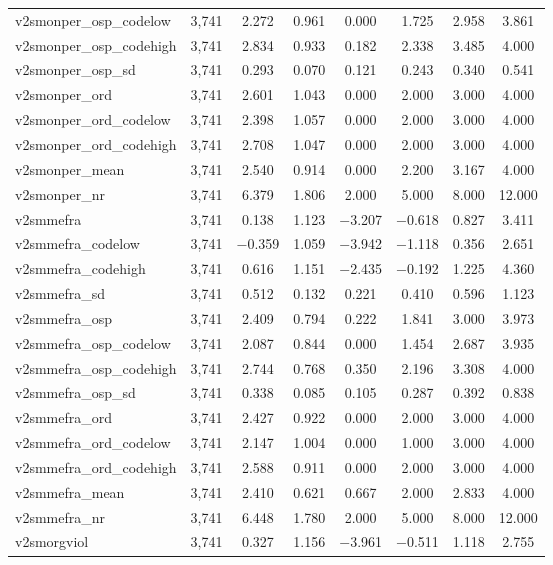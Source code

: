 \begin{table}[!htbp]
\begin{tabular}{@{\extracolsep{5pt}}lccccccc}
v2smonper\_osp\_codelow & 3,741 & 2.272 & 0.961 & 0.000 & 1.725 & 2.958 & 3.861 \\ 
v2smonper\_osp\_codehigh & 3,741 & 2.834 & 0.933 & 0.182 & 2.338 & 3.485 & 4.000 \\ 
v2smonper\_osp\_sd & 3,741 & 0.293 & 0.070 & 0.121 & 0.243 & 0.340 & 0.541 \\ 
v2smonper\_ord & 3,741 & 2.601 & 1.043 & 0.000 & 2.000 & 3.000 & 4.000 \\ 
v2smonper\_ord\_codelow & 3,741 & 2.398 & 1.057 & 0.000 & 2.000 & 3.000 & 4.000 \\ 
v2smonper\_ord\_codehigh & 3,741 & 2.708 & 1.047 & 0.000 & 2.000 & 3.000 & 4.000 \\ 
v2smonper\_mean & 3,741 & 2.540 & 0.914 & 0.000 & 2.200 & 3.167 & 4.000 \\ 
v2smonper\_nr & 3,741 & 6.379 & 1.806 & 2.000 & 5.000 & 8.000 & 12.000 \\ 
v2smmefra & 3,741 & 0.138 & 1.123 & $-$3.207 & $-$0.618 & 0.827 & 3.411 \\ 
v2smmefra\_codelow & 3,741 & $-$0.359 & 1.059 & $-$3.942 & $-$1.118 & 0.356 & 2.651 \\ 
v2smmefra\_codehigh & 3,741 & 0.616 & 1.151 & $-$2.435 & $-$0.192 & 1.225 & 4.360 \\ 
v2smmefra\_sd & 3,741 & 0.512 & 0.132 & 0.221 & 0.410 & 0.596 & 1.123 \\ 
v2smmefra\_osp & 3,741 & 2.409 & 0.794 & 0.222 & 1.841 & 3.000 & 3.973 \\ 
v2smmefra\_osp\_codelow & 3,741 & 2.087 & 0.844 & 0.000 & 1.454 & 2.687 & 3.935 \\ 
v2smmefra\_osp\_codehigh & 3,741 & 2.744 & 0.768 & 0.350 & 2.196 & 3.308 & 4.000 \\ 
v2smmefra\_osp\_sd & 3,741 & 0.338 & 0.085 & 0.105 & 0.287 & 0.392 & 0.838 \\ 
v2smmefra\_ord & 3,741 & 2.427 & 0.922 & 0.000 & 2.000 & 3.000 & 4.000 \\ 
v2smmefra\_ord\_codelow & 3,741 & 2.147 & 1.004 & 0.000 & 1.000 & 3.000 & 4.000 \\ 
v2smmefra\_ord\_codehigh & 3,741 & 2.588 & 0.911 & 0.000 & 2.000 & 3.000 & 4.000 \\ 
v2smmefra\_mean & 3,741 & 2.410 & 0.621 & 0.667 & 2.000 & 2.833 & 4.000 \\ 
v2smmefra\_nr & 3,741 & 6.448 & 1.780 & 2.000 & 5.000 & 8.000 & 12.000 \\ 
v2smorgviol & 3,741 & 0.327 & 1.156 & $-$3.961 & $-$0.511 & 1.118 & 2.755 \\ 

\end{tabular}
\end{table}
